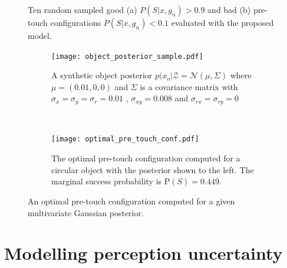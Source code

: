 \begin{figure}[!htbp]
\centering
\def\svgwidth{1\linewidth}

\caption{Ten random sampled good (a) $P(S | x ,g_n) > 0.9$ and bad (b) pre-touch configurations $P(S |x,g_n) < 0.1$ evaluated with the proposed model.}
\label{fig:circular_grasp_success}
\end{figure}	 

\begin{figure}
    \centering
    \begin{subfigure}[b]{0.45\textwidth}
        \texttt{[image: object\_posterior\_sample.pdf]}
        \caption{A synthetic object posterior $p(x_o|\mathcal{Z} = \mathcal{N}(\mu, \Sigma)$ where $\mu = \left( 0.01,0,0  \right) $ and $\Sigma$ is a covariance matrix with $\sigma_x = \sigma_y = \sigma_r = 0.01$ , $\sigma_{xy} = 0.008$ and $\sigma_{rx} = \sigma_{ry} = 0$ }
        \label{fig:object_posterior_sample}
    \end{subfigure}
    ~ %
    \begin{subfigure}[b]{0.45\textwidth}
        \texttt{[image: optimal\_pre\_touch\_conf.pdf]}
        \caption{The optimal pre-touch configuration computed for a circular object with the posterior shown to the left. The marginal success probability is $\text{P}(S) = 0.449$.}
        \label{fig:optimal_pre_touch_conf}
    \end{subfigure}
    \caption{An optimal pre-touch configuration computed for a given multivariate Gaussian posterior.}\label{fig:2dexample}
\end{figure}










\section{Modelling perception uncertainty}



